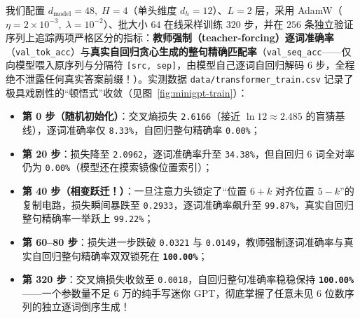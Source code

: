 我们配置 $d_{\text{model}} = 48,\; H = 4$（单头维度 $d_h = 12$）、$L = 2$ 层，采用 AdamW（$\eta = 2\times 10^{-3},\; \lambda = 10^{-2}$）、批大小 $64$ 在线采样训练 $320$ 步，并在 $256$ 条独立验证序列上追踪两项严格区分的指标：\textbf{教师强制（teacher-forcing）逐词准确率}（\texttt{val\_tok\_acc}）与\textbf{真实自回归贪心生成的整句精确匹配率}（\texttt{val\_seq\_acc}——仅向模型喂入原序列与分隔符 \texttt{[src, sep]}，由模型自己逐词自回归解码 6 步，全程绝不泄露任何真实答案前缀！）。实测数据 \texttt{data/transformer\_train.csv} 记录了极具戏剧性的“顿悟式”收敛（见图~\ref{fig:minigpt-train}）：
\begin{itemize}
  \item \textbf{第 0 步（随机初始化）}：交叉熵损失 \texttt{2.6166}（接近 $\ln 12 \approx 2.485$ 的盲猜基线），逐词准确率仅 \texttt{8.33\%}，自回归整句精确率 \texttt{0.00\%}；
  \item \textbf{第 20 步}：损失降至 \texttt{2.0962}，逐词准确率升至 \texttt{34.38\%}，但自回归 6 词全对率仍为 \texttt{0.00\%}（模型还在摸索镜像位置索引）；
  \item \textbf{第 40 步（相变跃迁！）}：一旦注意力头锁定了“位置 $6+k$ 对齐位置 $5-k$”的复制电路，损失瞬间暴跌至 \texttt{0.2933}，逐词准确率飙升至 \texttt{99.87\%}，真实自回归整句精确率一举跃上 \texttt{99.22\%}；
  \item \textbf{第 60--80 步}：损失进一步跌破 \texttt{0.0321} 与 \texttt{0.0149}，教师强制逐词准确率与真实自回归整句精确率双双锁死在 \textbf{\texttt{100.00\%}}；
  \item \textbf{第 320 步}：交叉熵损失收敛至 \texttt{0.0018}，自回归整句准确率稳稳保持 \textbf{\texttt{100.00\%}}——一个参数量不足 6 万的纯手写迷你 GPT，彻底掌握了任意未见 6 位数序列的独立逐词倒序生成！
\end{itemize}

